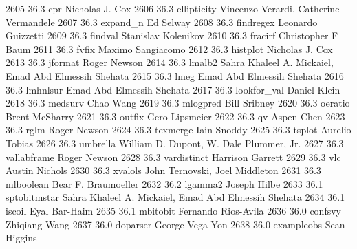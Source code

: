   2605     36.3    cpr           Nicholas J. Cox                         
  2606     36.3    ellipticity   Vincenzo Verardi, Catherine Vermandele  
  2607     36.3    expand_n      Ed Selway                               
  2608     36.3    findregex     Leonardo Guizzetti                      
  2609     36.3    findval       Stanislav Kolenikov                     
  2610     36.3    fracirf       Christopher F Baum                      
  2611     36.3    fvfix         Maximo Sangiacomo                       
  2612     36.3    histplot      Nicholas J. Cox                         
  2613     36.3    jformat       Roger Newson                            
  2614     36.3    lmalb2        Sahra Khaleel A. Mickaiel, Emad Abd     
                                   Elmessih Shehata                        
  2615     36.3    lmeg          Emad Abd Elmessih Shehata               
  2616     36.3    lmhnlsur      Emad Abd Elmessih Shehata               
  2617     36.3    lookfor_val   Daniel Klein                            
  2618     36.3    medsurv       Chao Wang                               
  2619     36.3    mlogpred      Bill Sribney                            
  2620     36.3    oeratio       Brent McSharry                          
  2621     36.3    outfix        Gero Lipsmeier                          
  2622     36.3    qv            Aspen Chen                              
  2623     36.3    rglm          Roger Newson                            
  2624     36.3    texmerge      Iain Snoddy                             
  2625     36.3    tsplot        Aurelio Tobias                          
  2626     36.3    umbrella      William D. Dupont, W. Dale Plummer, Jr. 
  2627     36.3    vallabframe   Roger Newson                            
  2628     36.3    vardistinct   Harrison Garrett                        
  2629     36.3    vlc           Austin Nichols                          
  2630     36.3    xvalols       John Ternovski, Joel Middleton          
  2631     36.3    mlboolean     Bear F. Braumoeller                     
  2632     36.2    lgamma2       Joseph Hilbe                            
  2633     36.1    sptobitmstar  Sahra Khaleel A. Mickaiel, Emad Abd     
                                   Elmessih Shehata                        
  2634     36.1    iscoil        Eyal Bar-Haim                           
  2635     36.1    mbitobit      Fernando Rios-Avila                     
  2636     36.0    confsvy       Zhiqiang Wang                           
  2637     36.0    doparser      George Vega Yon                         
  2638     36.0    exampleobs    Sean Higgins                            
